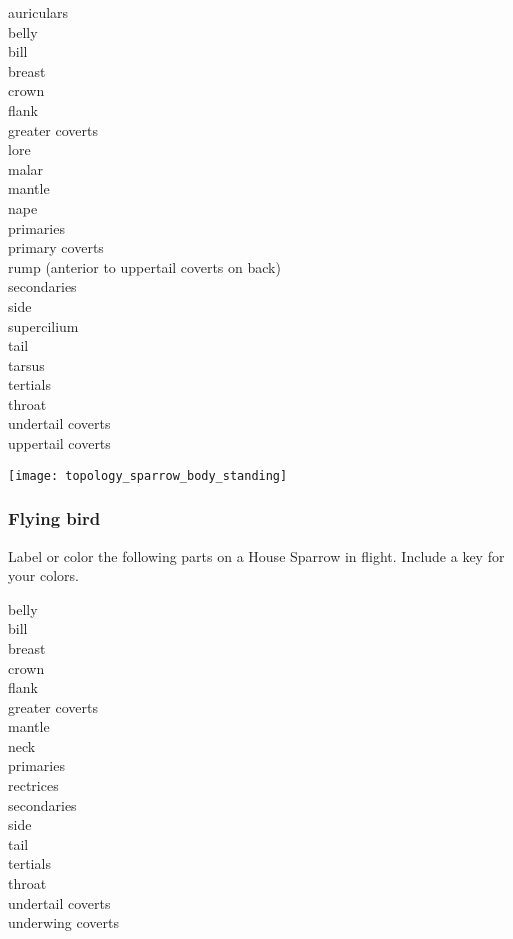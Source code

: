 \documentclass[10pt]{article}
\begin{document}
\begin{multicols}{3}
auriculars\\
belly\\
bill\\
breast\\
crown\\
flank\\
greater coverts\\
lore\\
malar\\
mantle\\
nape\\
primaries\\
primary coverts\\
rump (anterior to uppertail\newline
\phantom{M}coverts on back)\\
secondaries\\
side\\
supercilium\\
tail\\
tarsus\\
tertials\\
throat\\
undertail coverts\\
uppertail coverts
\end{multicols}

\begin{center}
\texttt{[image: topology\_sparrow\_body\_standing]}
\end{center}

\newpage


\subsubsection*{Flying bird}

Label or color the following parts on a House Sparrow in flight. Include a key for your colors.


\begin{multicols}{3}
belly\\
bill\\
breast\\
crown\\
flank\\
greater coverts\\
mantle\\
neck\\
primaries\\
rectrices\\
secondaries\\
side\\
tail\\
tertials\\
throat\\
undertail coverts\\
underwing coverts
\end{multicols}
\end{document}
